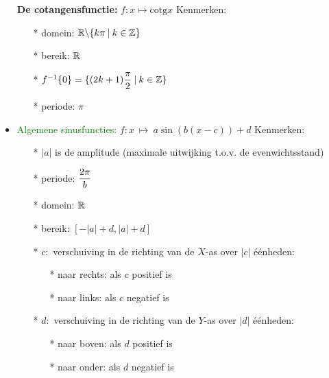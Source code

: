 \begin{itemize}
\hypertarget{}{{\bf De cotangensfunctie: }}\label{cotangensfunctie}$f :x\mapsto\mbox{cotg}x$
\vskip 0.5cm
Kenmerken:\begin{itemize}
		\item[*] domein: $\mathbb{R} \backslash \{k \pi\:|\:k\in\mathbb{Z}\}$
		\item[*] bereik: $\mathbb{R}$
		\item[*] $f^{-1}\{0\}=\{(2k+1)\displaystyle\frac{\displaystyle \pi}{\displaystyle 2}\:|\:k\in\mathbb{Z}\}$
		\item[*] periode: $\pi$
		\end{itemize}	

\item \textcolor{green}{\hypertarget{algemene_sinusfunctie}{Algemene sinusfuncties: }}$f:x\:\mapsto\: a\sin(b(x-c))+d$ \label{algemene_sinusfunctie}\newline\newline
Kenmerken:\begin{itemize}
		\item[*] $|a|$ is de amplitude (maximale uitwijking t.o.v. de 				evenwichtsstand)
		\item[*] periode: $\displaystyle\frac{\displaystyle 2\pi}{\displaystyle b}$
		\item[*] domein: $\mathbb{R}$
		\item[*] bereik: $[-|a|+d, |a|+d]$
		\item[*] $c:$ verschuiving in de richting van de $X$-as over $|c|$ 					\'e\'enheden:\newline
			\begin{itemize}
			\item[*] naar rechts: als $c$ positief is
			\item[*] naar links: als $c$ negatief is
			\end{itemize}
		\item[*] $d:$ verschuiving in de richting van de $Y$-as over $|d|$ 					\'e\'enheden:\newline
			\begin{itemize}
			\item[*] naar boven: als $d$ positief is
			\item[*] naar onder: als $d$ negatief is
			\end{itemize}


\end{itemize}
\end{itemize}
